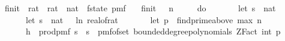 \begin{isabellebody}
\isanewline
{}\isamarkupfalse%
\ f{}{\isacharunderscore}{\kern0pt}init\ {\isacharcolon}{\kern0pt}{\isacharcolon}{\kern0pt}\ {\isachardoublequoteopen}rat\ {\isasymRightarrow}\ rat\ {\isasymRightarrow}\ nat\ {\isasymRightarrow}\ f{}{\isacharunderscore}{\kern0pt}state\ pmf{\isachardoublequoteclose}\ \isanewline
\ \ {\isachardoublequoteopen}f{}{\isacharunderscore}{\kern0pt}init\ {\isasymdelta}\ {\isasymepsilon}\ n\ {\isacharequal}{\kern0pt}\isanewline
\ \ \ \ do\ {\isacharbraceleft}{\kern0pt}\isanewline
\ \ \ \ \ \ let\ s\ {\isacharequal}{\kern0pt}\ nat\ {\isasymlceil}{}\ {\isacharslash}{\kern0pt}\ {\isasymdelta}\isanewline
\ \ \ \ \ \ let\ s\ {\isacharequal}{\kern0pt}\ nat\ {\isasymlceil}{\isacharminus}{\kern0pt}{\isacharparenleft}{\kern0pt}{}{}\ {\isacharasterisk}{\kern0pt}\ ln\ {\isacharparenleft}{\kern0pt}real{\isacharunderscore}{\kern0pt}of{\isacharunderscore}{\kern0pt}rat\ {\isasymepsilon}{\isacharparenright}{\kern0pt}{\isacharparenright}{\kern0pt}{\isasymrceil}{\isacharsemicolon}{\kern0pt}\isanewline
\ \ \ \ \ \ let\ p\ {\isacharequal}{\kern0pt}\ find{\isacharunderscore}{\kern0pt}prime{\isacharunderscore}{\kern0pt}above\ {\isacharparenleft}{\kern0pt}max\ n\ {}{\isacharparenright}{\kern0pt}{\isacharsemicolon}{\kern0pt}\isanewline
\ \ \ \ \ \ h\ {\isasymleftarrow}\ prod{\isacharunderscore}{\kern0pt}pmf\ {\isacharparenleft}{\kern0pt}{\isacharbraceleft}{\kern0pt}{}{\isachardot}{\kern0pt}{\isachardot}{\kern0pt}{\isacharless}{\kern0pt}s\ {\isasymtimes}\ {\isacharbraceleft}{\kern0pt}{}{\isachardot}{\kern0pt}{\isachardot}{\kern0pt}{\isacharless}{\kern0pt}s\ {\isacharparenleft}{\kern0pt}{\isasymlambda}{\isacharunderscore}{\kern0pt}{\isachardot}{\kern0pt}\ pmf{\isacharunderscore}{\kern0pt}of{\isacharunderscore}{\kern0pt}set\ {\isacharparenleft}{\kern0pt}bounded{\isacharunderscore}{\kern0pt}degree{\isacharunderscore}{\kern0pt}polynomials\ {\isacharparenleft}{\kern0pt}ZFact\ {\isacharparenleft}{\kern0pt}int\ p{\isacharparenright}{\kern0pt}{\isacharparenright}{\kern0pt}\ {}{\isacharparenright}{\kern0pt}{\isacharparenright}{\kern0pt}{\isacharsemicolon}{\kern0pt}\isanewline

\end{isabellebody}
